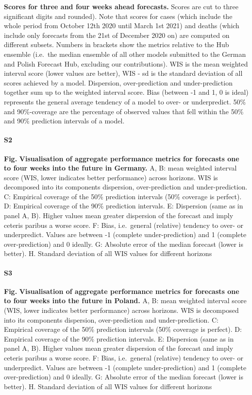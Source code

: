 \documentclass[10pt,letterpaper]{article}
\begin{document}
\textbf{Scores for three and four weeks ahead forecasts.} Scores are cut
to three significant digits and rounded). Note that scores for cases
(which include the whole period from October 12th 2020 until March 1st
2021) and deaths (which include only forecasts from the 21st of December
2020 on) are computed on different subsets. Numbers in brackets show the
metrics relative to the Hub ensemble (i.e.~the median ensemble of all
other models submitted to the German and Polish Forecast Hub, excluding
our contributions). WIS is the mean weighted interval score (lower
values are better), WIS - sd is the standard deviation of all scores
achieved by a model. Dispersion, over-prediction and under-prediction
together sum up to the weighted interval score. Bias (between -1 and 1,
0 is ideal) represents the general average tendency of a model to over-
or underpredict. 50\% and 90\%-coverage are the percentage of observed
values that fell within the 50\% and 90\% prediction intervals of a
model.

\paragraph{S2}

\textbf{Fig.} \label{fig:agg-performance-all-Germany}
\textbf{Visualisation of aggregate performance metrics for forecasts one to four weeks into the future in Germany.}
A, B: mean weighted interval score (WIS, lower indicates better
performance) across horizons. WIS is decomposed into its components
dispersion, over-prediction and under-prediction. C: Empirical coverage
of the 50\% prediction intervals (50\% coverage is perfect). D:
Empirical coverage of the 90\% prediction intervals. E: Dispersion (same
as in panel A, B). Higher values mean greater dispersion of the forecast
and imply ceteris paribus a worse score. F: Bias, i.e.~general
(relative) tendency to over- or underpredict. Values are between -1
(complete under-prediction) and 1 (complete over-prediction) and 0
ideally. G: Absolute error of the median forecast (lower is better). H.
Standard deviation of all WIS values for different horizons

\paragraph{S3}

\textbf{Fig.} \label{fig:agg-performance-all-Poland}
\textbf{Visualisation of aggregate performance metrics for forecasts one to four weeks into the future in Poland.}
A, B: mean weighted interval score (WIS, lower indicates better
performance) across horizons. WIS is decomposed into its components
dispersion, over-prediction and under-prediction. C: Empirical coverage
of the 50\% prediction intervals (50\% coverage is perfect). D:
Empirical coverage of the 90\% prediction intervals. E: Dispersion (same
as in panel A, B). Higher values mean greater dispersion of the forecast
and imply ceteris paribus a worse score. F: Bias, i.e.~general
(relative) tendency to over- or underpredict. Values are between -1
(complete under-prediction) and 1 (complete over-prediction) and 0
ideally. G: Absolute error of the median forecast (lower is better). H.
Standard deviation of all WIS values for different horizons
\end{document}
